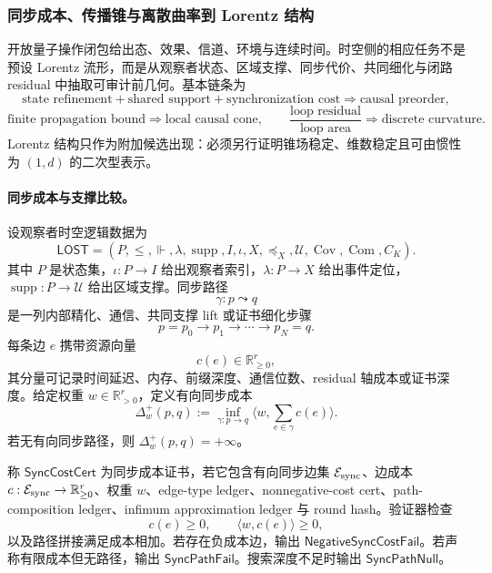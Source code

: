 \subsubsection{同步成本、传播锥与离散曲率到 Lorentz 结构}\label{subsubsec:typed-address-biaxial-completion-sync-cost-propagation-cone-discrete-curvature-lorentz-structure}
开放量子操作闭包给出态、效果、信道、环境与连续时间。时空侧的相应任务不是预设 Lorentz 流形，而是从观察者状态、区域支撑、同步代价、共同细化与闭路 residual 中抽取可审计前几何。基本链条为
\[
\text{state refinement}
+
\text{shared support}
+
\text{synchronization cost}
\Longrightarrow
\text{causal preorder},
\]
\[
\text{finite propagation bound}
\Longrightarrow
\text{local causal cone},
\qquad
\frac{\text{loop residual}}{\text{loop area}}
\Longrightarrow
\text{discrete curvature}.
\]
Lorentz 结构只作为附加候选出现：必须另行证明锥场稳定、维数稳定且可由惯性为 \((1,d)\) 的二次型表示。

\paragraph{同步成本与支撑比较。}
设观察者时空逻辑数据为
\[
\mathsf{LOST}=(P,\le,\Vdash,\lambda,\operatorname{supp},I,\iota,X,\preceq_X,\mathcal U,\operatorname{Cov},\operatorname{Com},C_K).
\]
其中 \(P\) 是状态集，\(\iota:P\to I\) 给出观察者索引，\(\lambda:P\to X\) 给出事件定位，\(\operatorname{supp}:P\to\mathcal U\) 给出区域支撑。同步路径
\[
\gamma:p\leadsto q
\]
是一列内部精化、通信、共同支撑 lift 或证书细化步骤
\[
p=p_0\to p_1\to\cdots\to p_N=q.
\]
每条边 \(e\) 携带资源向量
\[
c(e)\in\mathbb R_{\ge0}^r,
\]
其分量可记录时间延迟、内存、前缀深度、通信位数、residual 轴成本或证书深度。给定权重 \(w\in\mathbb R_{>0}^r\)，定义有向同步成本
\[
\boxed{
\Delta_w^+(p,q):=
\inf_{\gamma:p\to q}\langle w,\sum_{e\in\gamma}c(e)\rangle.
}
\]
若无有向同步路径，则 \(\Delta_w^+(p,q)=+\infty\)。

\begin{definition}[同步成本证书]\label{def:typed-address-biaxial-completion-sync-cost-cert}
称 \(\mathsf{SyncCostCert}\) 为同步成本证书，若它包含有向同步边集 \(\mathcal E_{\rm sync}\)、边成本 \(c:\mathcal E_{\rm sync}\to\mathbb R_{\ge0}^r\)、权重 \(w\)、edge-type ledger、nonnegative-cost cert、path-composition ledger、infimum approximation ledger 与 round hash。验证器检查
\[
c(e)\ge0,
\qquad
\langle w,c(e)\rangle\ge0,
\]
以及路径拼接满足成本相加。若存在负成本边，输出 \(\mathsf{NegativeSyncCostFail}\)。若声称有限成本但无路径，输出 \(\mathsf{SyncPathFail}\)。搜索深度不足时输出 \(\mathsf{SyncPathNull}\)。
\end{definition}

